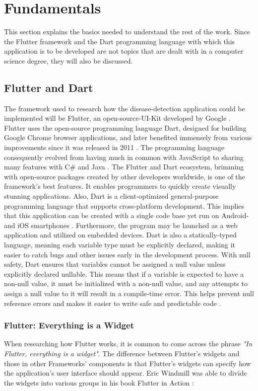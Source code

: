\chapter{Fundamentals}
This section explains the basics needed to understand the rest of the work. Since the Flutter framework and the Dart programming language with which this application is to be developed are not topics that are dealt with in a computer science degree, they will also be discussed.

\section{Flutter and Dart}
The framework used to research how the disease-detection application could be implemented will be Flutter, an open-source-UI-Kit developed by Google  \cite{.flutterDEV}. Flutter uses the open-source programming language Dart, designed for building Google Chrome browser applications, and later benefited immensely from various improvements since it was released in 2011 \cite{whatisdart}. The programming language consequently evolved from having much in common with JavaScript to sharing many features with C\# and Java \cite{.javadart}. The Flutter and Dart ecosystem, brimming with open-source packages created by other developers worldwide, is one of the framework's best features. It enables programmers to quickly create visually stunning applications. Also, Dart is a client-optimized general-purpose programming language that supports cross-platform development. This implies that this application can be created with a single code base yet run on Android- and iOS smartphones \cite{.dartoverview}.
Furthermore, the program may be launched as a web application and utilized on embedded devices. Dart is also a statically-typed language, meaning each variable type must be explicitly declared, making it easier to catch bugs and other issues early in the development process. With null safety, Dart ensures that variables cannot be assigned a null value unless explicitly declared nullable. This means that if a variable is expected to have a non-null value, it must be initialized with a non-null value, and any attempts to assign a null value to it will result in a compile-time error. This helps prevent null reference errors and makes it easier to write safe and predictable code \cite{.dartoverview}.

\subsection{Flutter: Everything is a Widget}
When researching how Flutter works, it is common to come across the phrase \emph{"In Flutter, everything is a widget"}. The difference between Flutter's widgets and those in other Frameworks' components is that Flutter's widgets can specify how the application's user interface should appear. Eric Windmill was able to divide the widgets into various groups in his book Flutter in Action \cite[p. 58]{.flutterinaction}:

